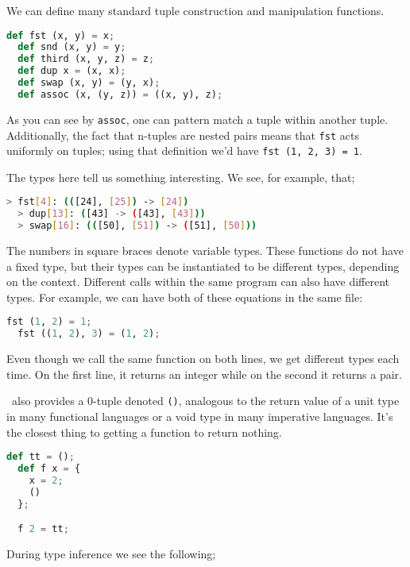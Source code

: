 We can define many standard tuple construction and manipulation functions.

\begin{lstlisting}[language=Python]
  def fst (x, y) = x;
  def snd (x, y) = y;
  def third (x, y, z) = z;
  def dup x = (x, x);
  def swap (x, y) = (y, x);
  def assoc (x, (y, z)) = ((x, y), z);
\end{lstlisting}

As you can see by \lstinline{assoc}, one can pattern match a tuple within another tuple. Additionally, the fact that n-tuples are nested pairs means that \lstinline{fst} acts uniformly on tuples; using that definition we'd have \lstinline{fst (1, 2, 3) = 1}.

The types here tell us something interesting. We see, for example, that;

\begin{lstlisting}[language=bash]
  > fst[4]: (([24], [25]) -> [24])
  > dup[13]: ([43] -> ([43], [43]))
  > swap[16]: (([50], [51]) -> ([51], [50]))
\end{lstlisting}

The numbers in square braces denote variable types. These functions do not have a fixed type, but their types can be instantiated to be different types, depending on the context. Different calls within the same program can also have different types. For example, we can have both of these equations in the same file:

\begin{lstlisting}[language=Python]
  fst (1, 2) = 1;
  fst ((1, 2), 3) = (1, 2);
\end{lstlisting}

Even though we call the same function on both lines, we get different types each time. On the first line, it returns an integer while on the second it returns a pair.

\vampir\ also provides a 0-tuple denoted \lstinline{()}, analogous to the return value of a unit type in many functional languages or a void type in many imperative languages. It's the closest thing to getting a function to return nothing.

\pagebreak

\begin{lstlisting}[language=Python]
  def tt = ();
  def f x = {
    x = 2;
    ()
  };

  f 2 = tt;
\end{lstlisting}

During type inference we see the following;

